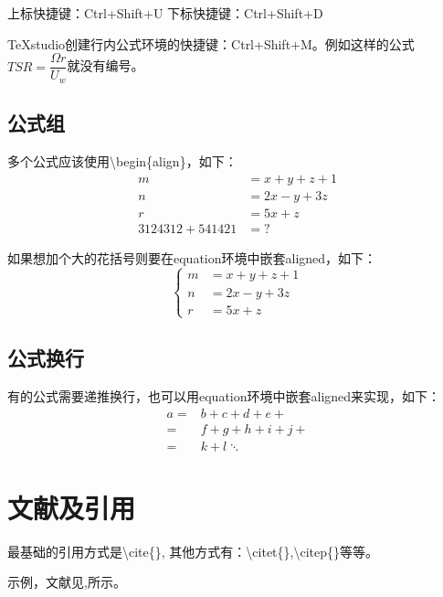 \documentclass[]{article}	%
\begin{document}
上标快捷键：Ctrl+Shift+U
下标快捷键：Ctrl+Shift+D

TeXstudio创建行内公式环境的快捷键：Ctrl+Shift+M。例如这样的公式$ TSR=\dfrac{\Omega r}{U_{w}} $就没有编号。

\subsection{公式组}

多个公式应该使用\textbackslash begin\{align\}，如下：
\begin{align}
	m & = x + y + z + 1 \\
	n & = 2x - y + 3z \\
	r & = 5x + z \\
	3124312 + 541421 & = ?
\end{align}

如果想加个大的花括号则要在equation环境中嵌套aligned，如下：
\begin{equation}
	\left\{
	\begin{aligned}
		m & = x + y + z + 1 \\
		n & = 2x - y + 3z \\
		r & = 5x + z
	\end{aligned}
	\right.
\end{equation}


\subsection{公式换行}



有的公式需要递推换行，也可以用equation环境中嵌套aligned来实现，如下：
\begin{equation}
	\begin{aligned}
		a = & b + c + d + e + \\
		  = & f + g + h + i + j + \\
		  = & k + l\ddots
	\end{aligned}
\end{equation}

\section{文献及引用}

最基础的引用方式是\textbackslash cite\{\}, 其他方式有：\textbackslash citet\{\},\textbackslash citep\{\}等等。

示例，文献见\cite{Davis1995Bose},\cite{Ertekin2014,Davis1995Bose}所示。



\newpage
\end{document}
